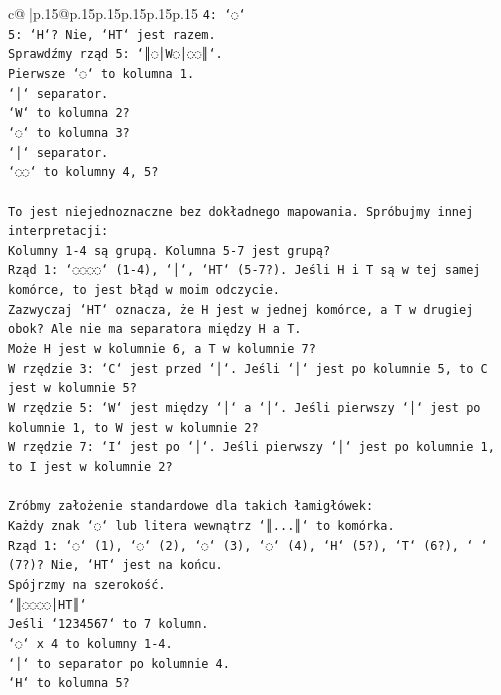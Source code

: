 \documentclass{article}
\begin{document}
{\begin{supertabular}{c@{$\;$}|p{.15\linewidth}@{}p{.15\linewidth}p{.15\linewidth}p{.15\linewidth}p{.15\linewidth}p{.15\linewidth}}
{{{\texttt{4: `◌`} \\
\texttt{5: `H`? Nie, `HT` jest razem.} \\
\texttt{Sprawdźmy rząd 5: `║◌│W◌│◌◌║`.} \\
\texttt{Pierwsze `◌` to kolumna 1.} \\
\texttt{`│` separator.} \\
\texttt{`W` to kolumna 2?} \\
\texttt{`◌` to kolumna 3?} \\
\texttt{`│` separator.} \\
\texttt{`◌◌` to kolumny 4, 5?} \\
\\ 
\texttt{To jest niejednoznaczne bez dokładnego mapowania. Spróbujmy innej interpretacji:} \\
\texttt{Kolumny 1{-}4 są grupą. Kolumna 5{-}7 jest grupą?} \\
\texttt{Rząd 1: `◌◌◌◌` (1{-}4), `│`, `HT` (5{-}7?). Jeśli H i T są w tej samej komórce, to jest błąd w moim odczycie.} \\
\texttt{Zazwyczaj `HT` oznacza, że H jest w jednej komórce, a T w drugiej obok? Ale nie ma separatora między H a T.} \\
\texttt{Może H jest w kolumnie 6, a T w kolumnie 7?} \\
\texttt{W rzędzie 3: `C` jest przed `│`. Jeśli `│` jest po kolumnie 5, to C jest w kolumnie 5?} \\
\texttt{W rzędzie 5: `W` jest między `│` a `│`. Jeśli pierwszy `│` jest po kolumnie 1, to W jest w kolumnie 2?} \\
\texttt{W rzędzie 7: `I` jest po `│`. Jeśli pierwszy `│` jest po kolumnie 1, to I jest w kolumnie 2?} \\
\\ 
\texttt{Zróbmy założenie standardowe dla takich łamigłówek:} \\
\texttt{Każdy znak `◌` lub litera wewnątrz `║...║` to komórka.} \\
\texttt{Rząd 1: `◌` (1), `◌` (2), `◌` (3), `◌` (4), `H` (5?), `T` (6?), ` ` (7?)? Nie, `HT` jest na końcu.} \\
\texttt{Spójrzmy na szerokość.} \\
\texttt{`║◌◌◌◌│HT║`} \\
\texttt{Jeśli `1234567` to 7 kolumn.} \\
\texttt{`◌` x 4 to kolumny 1{-}4.} \\
\texttt{`│` to separator po kolumnie 4.} \\
\texttt{`H` to kolumna 5?} \\
}}}
\end{supertabular}}
\end{document}
